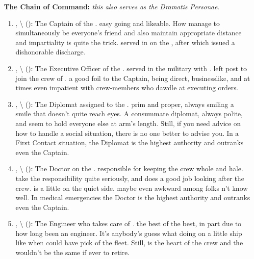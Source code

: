 \documentclass[blue]{TMFHope}
\begin{document}
{\bf The \pNew{} Chain of Command:} \emph{this also serves as the Dramatis Personae.}
\begin{enumerate}
  \item \cCap{\full}, \cCap{\they}\textbackslash\cCap{\them} (\cCap{\MYplayer}): The Captain of the \pNew{}. \cCap{\They} \cCap{\are} easy going and likeable. How \cCap{\they} manage\cCap{\plural} to simultaneously be everyone's friend and also maintain appropriate distance and impartiality is quite the trick. \cCap{\They} served in \pBattle{} on the \pOld{}, after which \cCap{\they} \cCap{\were} issued a dishonorable discharge.
  
  \item \cXO{\full}, \cXO{\they}\textbackslash\cXO{\them} (\cXO{\MYplayer}): The Executive Officer of the \pNew{}. \cXO{} served in the \pPlan{} military with \cCap{}. \cXO{\They} left \cXO{\their} post to join the crew of \pNew{}. \cXO{\They} \cXO{\are} a good foil to the Captain, being direct, businesslike, and at times even impatient with crew-members who dawdle at executing orders.
  
  \item \cDip{\full}, \cDip{\they}\textbackslash\cDip{\them} (\cDip{\MYplayer}): The Diplomat assigned to the \pNew{}. \cDip{\They} \cDip{\are} prim and proper, always smiling a smile that doesn't quite reach \cDip{\their} eyes. A consummate diplomat, \cDip{\they} \cDip{\are} always polite, and seem\cDip{\plural} to hold everyone else at arm's length. Still, if you need advice on how to handle a social situation, there is no one better to advise you. In a First Contact situation, the Diplomat is the highest authority and outranks even the Captain.
  
  \item \cMed{\full}, \cMed{\they}\textbackslash\cMed{\them} (\cMed{\MYplayer}): The Doctor on the  \pNew{}. \cMed{\They} \cMed{\are} responsible for keeping the crew whole and hale. \cMed{\They} take the responsibility quite seriously, and does a good job looking after the crew. \cMed{} is a little on the quiet side, maybe even awkward among folks \cMed{\they} \cMed{\do}n't know well. In medical emergencies the Doctor is the highest authority and outranks even the Captain.
  
  \item \cEng{\full}, \cEng{\they}\textbackslash\cEng{\them} (\cEng{\MYplayer}): The Engineer who takes care of \pNew{}. \cEng{\They} \cEng{\are} the best of the best, in part due to how long \cEng{\they} \cEng{\have} been an engineer. It's anybody's guess what \cEng{\they} \cEng{\are} doing on a little ship like \pNew{} when \cEng{\they} could have \cEng{\their} pick of the fleet. Still, \cEng{} is the heart of the crew and the \pNew{} wouldn't be the same if \cEng{\they} \cEng{\were} ever to retire.
  

\end{enumerate}
\end{document}
